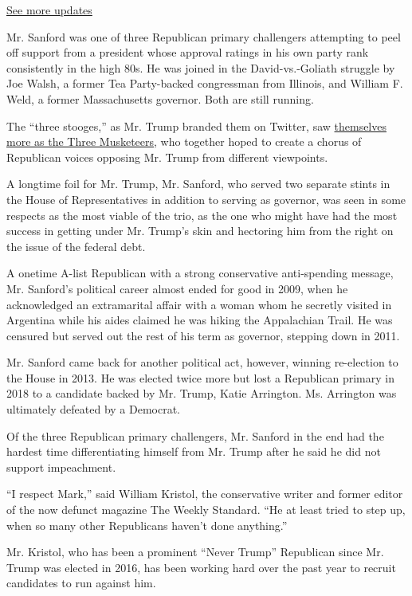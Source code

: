 \href{https://www.nytimes.com/2020/07/31/us/elections/biden-vs-trump.html?action=click\&pgtype=Article\&state=default\&region=MAIN_CONTENT_1\&context=storylines_live_updates}{See
more updates}

Mr. Sanford was one of three Republican primary challengers attempting
to peel off support from a president whose approval ratings in his own
party rank consistently in the high 80s. He was joined in the
David-vs.-Goliath struggle by Joe Walsh, a former Tea Party-backed
congressman from Illinois, and William F. Weld, a former Massachusetts
governor. Both are still running.

The ``three stooges,'' as Mr. Trump branded them on Twitter, saw
\href{https://www.nytimes.com/2019/09/19/us/politics/trump-republicans-challengers.html}{themselves
more as the Three Musketeers}, who together hoped to create a chorus of
Republican voices opposing Mr. Trump from different viewpoints.

A longtime foil for Mr. Trump, Mr. Sanford, who served two separate
stints in the House of Representatives in addition to serving as
governor, was seen in some respects as the most viable of the trio, as
the one who might have had the most success in getting under Mr. Trump's
skin and hectoring him from the right on the issue of the federal debt.

A onetime A-list Republican with a strong conservative anti-spending
message, Mr. Sanford's political career almost ended for good in 2009,
when he acknowledged an extramarital affair with a woman whom he
secretly visited in Argentina while his aides claimed he was hiking the
Appalachian Trail. He was censured but served out the rest of his term
as governor, stepping down in 2011.

Mr. Sanford came back for another political act, however, winning
re-election to the House in 2013. He was elected twice more but lost a
Republican primary in 2018 to a candidate backed by Mr. Trump, Katie
Arrington. Ms. Arrington was ultimately defeated by a Democrat.

Of the three Republican primary challengers, Mr. Sanford in the end had
the hardest time differentiating himself from Mr. Trump after he said he
did not support impeachment.

``I respect Mark,'' said William Kristol, the conservative writer and
former editor of the now defunct magazine The Weekly Standard. ``He at
least tried to step up, when so many other Republicans haven't done
anything.''

Mr. Kristol, who has been a prominent ``Never Trump'' Republican since
Mr. Trump was elected in 2016, has been working hard over the past year
to recruit candidates to run against him.

